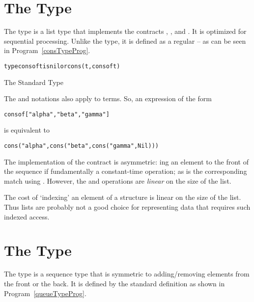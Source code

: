 \section{The  Type}
\label{consType}
The  type is a list type that implements the contracts , ,  and . It is optimized for sequential processing. Unlike the  type, it is defined as a regular  -- as can be seen in Program~\vref{consTypeProg}.

\begin{program}[H]
\begin{alltt}
type cons of t is nil or cons(t,cons of t)
\end{alltt}
\caption{The Standard  Type}\label{consTypeProg}
\end{program}

The  and  notations also apply to  terms. So, an expression of the form
\begin{alltt}
cons of ["alpha", "beta", "gamma"]
\end{alltt}
is equivalent to 
\begin{alltt}
cons("alpha", cons("beta", cons("gamma",Nil)))
\end{alltt}

\begin{aside}
The  implementation of the  contract is asymmetric: ing an element to the front of the  sequence if fundamentally a constant-time operation; as is the corresponding match using . However, the  and  operations are \emph{linear} on the size of the  list.
\end{aside}

\begin{aside}
The cost of `indexing' an element of a  structure is linear on the size of the  list. Thus  lists are probably not a good choice for representing data that requires such indexed access.
\end{aside}

\section{The  Type}
\label{queueType}
The  type is a sequence type that is symmetric to adding/removing elements from the front or the back. It is defined by the standard definition as shown in Program~\vref{queueTypeProg}.

